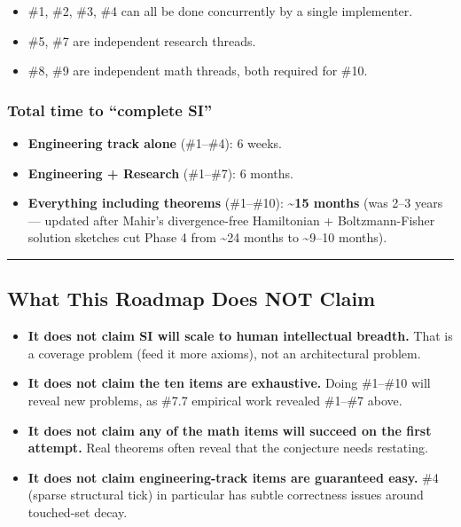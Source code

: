 \documentclass[
  11pt,
  a4paper,
]{article}
\providecommand{\tightlist}{%
  \setlength{\itemsep}{0pt}\setlength{\parskip}{0pt}}
\begin{document}
\begin{itemize}
\tightlist
\item
  \#1, \#2, \#3, \#4 can all be done concurrently by a single
  implementer.
\item
  \#5, \#7 are independent research threads.
\item
  \#8, \#9 are independent math threads, both required for \#10.
\end{itemize}

\subsubsection{Total time to ``complete
SI''}\label{total-time-to-complete-si}

\begin{itemize}
\tightlist
\item
  \textbf{Engineering track alone} (\#1--\#4): 6 weeks.
\item
  \textbf{Engineering + Research} (\#1--\#7): 6 months.
\item
  \textbf{Everything including theorems} (\#1--\#10):
  \textbf{\textasciitilde15 months} (was 2--3 years --- updated after
  Mahir's divergence-free Hamiltonian + Boltzmann-Fisher solution
  sketches cut Phase 4 from \textasciitilde24 months to
  \textasciitilde9--10 months).
\end{itemize}

\begin{center}\rule{0.5\linewidth}{0.5pt}\end{center}

\subsection{What This Roadmap Does NOT
Claim}\label{what-this-roadmap-does-not-claim}

\begin{itemize}
\tightlist
\item
  \textbf{It does not claim SI will scale to human intellectual
  breadth.} That is a coverage problem (feed it more axioms), not an
  architectural problem.
\item
  \textbf{It does not claim the ten items are exhaustive.} Doing
  \#1--\#10 will reveal new problems, as \#7.7 empirical work revealed
  \#1--\#7 above.
\item
  \textbf{It does not claim any of the math items will succeed on the
  first attempt.} Real theorems often reveal that the conjecture needs
  restating.
\item
  \textbf{It does not claim engineering-track items are guaranteed
  easy.} \#4 (sparse structural tick) in particular has subtle
  correctness issues around touched-set decay.
\end{itemize}
\end{document}

